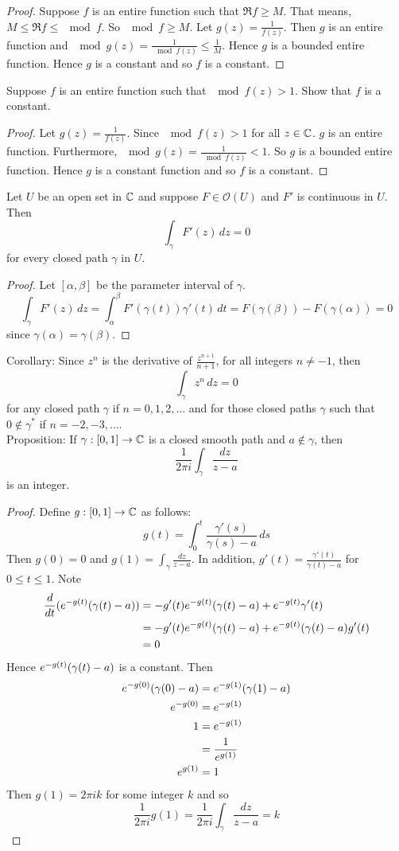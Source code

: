 \documentclass[12pt]{article}
\begin{document}
\begin{proof} Suppose $f$ is an entire function such that $\Re{f} \geq M$. That means, $M \leq \Re{f} \leq \mod{f}$. So $\mod{f} \geq M$. Let $g(z) = \frac{1}{f(z)}$. Then $g$ is an entire function and $\mod{g(z)} = \frac{1}{\mod{f(z)}} \leq \frac{1}{M}$. Hence $g$ is a bounded entire function. Hence $g$ is a constant and so $f$ is a constant. \end{proof} 
Suppose $f$ is an entire function such that $\mod{f(z)} > 1$. Show that $f$ is a constant. 
\begin{proof} Let $g(z) = \frac{1}{f(z)}$. Since $\mod{f(z)} > 1$ for all $z \in \mathbb{C}$. $g$ is an entire function. Furthermore, $\mod{g(z)} = \frac{1}{\mod{f(z)}} < 1$. So $g$ is a bounded entire function. Hence $g$ is a constant function and so $f$ is a constant. \end{proof}
\begin{theorem} Let $U$ be an open set in $\mathbb{C}$ and suppose $F \in \mathcal{O}(U)$ and $F'$ is continuous in $U$. Then $$\int_\gamma F'(z) \,dz = 0$$ for every closed path $\gamma$ in $U$. \end{theorem} 
\begin{proof} Let $[\alpha, \beta]$ be the parameter interval of $\gamma$. $$ \int_\gamma F'(z) \, dz = \int_\alpha^\beta F'(\gamma(t))\gamma'(t) \,dt = F(\gamma(\beta)) - F(\gamma(\alpha)) = 0$$ since $\gamma(\alpha) = \gamma(\beta)$. \end{proof} 
Corollary: Since $z^n$ is the derivative of $\frac{z^{n+1}}{n+1}$, for all integers $n \neq -1$, then $$\int_\gamma z^n \, dz = 0$$ for any closed path $\gamma$ if $n = 0,1,2,\dots$ and for those closed paths $\gamma$ such that $0 \not\in \gamma^*$ if $n = -2,-3,\dots$. \\
Proposition: If $\gamma:[0,1] \to \mathbb{C}$ is a closed smooth path and $a \not\in \gamma$, then $$ \frac{1}{2\pi i} \int_\gamma \frac{dz}{z-a} $$ is an integer. 
\begin{proof} Define $g: [0,1] \to \mathbb{C}$ as follows: $$g(t) = \int_0^t \frac{\gamma'(s)}{\gamma(s) - a} \, ds $$ Then $g(0) = 0$ and $g(1) = \int_\gamma \frac{dz}{z-a}$. In addition, $g'(t) = \frac{\gamma'(t)}{\gamma(t) - a}$ for $0 \leq t \leq 1$. Note $$ \begin{aligned} \frac{d}{dt} (e^{-g(t)}(\gamma(t) - a)) &= -g'(t)e^{-g(t)}(\gamma(t) - a) + e^{-g(t)}\gamma'(t) \\ &= -g'(t)e^{-g(t)}(\gamma(t) - a) + e^{-g(t)}(\gamma(t) -a)g'(t) \\ &= 0 \end{aligned} $$
Hence $e^{-g(t)}(\gamma(t) - a)$ is a constant. Then $$ \begin{aligned} e^{-g(0)}(\gamma(0) - a) &= e^{-g(1)}(\gamma(1) - a) \\ e^{-g(0)} &= e^{-g(1)} \\ 1 &= e^{-g(1)} \\ &= \frac{1}{e^{g(1)}} \\ e^{g(1)} &= 1 \end{aligned} $$ 
Then $g(1) = 2\pi ik$ for some integer $k$ and so $$ \frac{1}{2\pi i} g(1) = \frac{1}{2\pi i} \int_\gamma \frac{dz}{z-a} = k $$ \end{proof}
\end{document}
